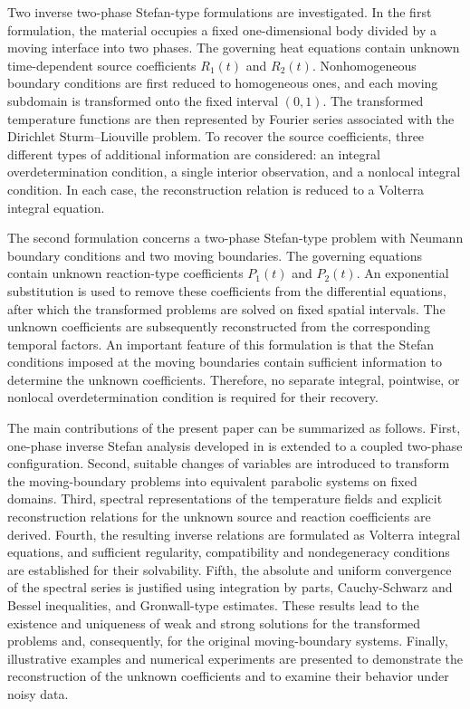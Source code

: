 \documentclass[preprint,12pt,authoryear]{elsarticle}
\begin{document}
Two inverse two-phase Stefan-type formulations are investigated. In the first
formulation, the material occupies a fixed one-dimensional body divided by a moving interface into two phases. The governing heat equations contain unknown time-dependent source coefficients \(R_1(t)\) and \(R_2(t)\). Nonhomogeneous boundary conditions are first reduced to homogeneous ones, and each moving subdomain is transformed onto the fixed interval \((0,1)\). The transformed temperature functions are then represented by Fourier series associated with the Dirichlet Sturm--Liouville problem. To recover the source coefficients, three different types of additional information are considered: an integral overdetermination condition, a single interior observation, and a nonlocal integral condition. In each case, the reconstruction relation is reduced to a Volterra integral equation.

The second formulation concerns a two-phase Stefan-type problem with Neumann boundary conditions and two moving boundaries. The governing equations contain unknown reaction-type coefficients \(P_1(t)\) and \(P_2(t)\). An exponential substitution is used to remove these coefficients from the differential equations, after which the transformed problems are solved on fixed spatial intervals. The unknown coefficients are subsequently reconstructed from the corresponding temporal factors. An important feature of this formulation is that the Stefan conditions imposed at the moving
boundaries contain sufficient information to determine the unknown coefficients. Therefore, no separate integral, pointwise, or nonlocal overdetermination condition is required for their recovery.

The main contributions of the present paper can be summarized as follows. First, one-phase inverse Stefan analysis developed in \cite{20} is extended to a coupled two-phase configuration. Second, suitable changes of variables are introduced to transform the moving-boundary problems into equivalent parabolic systems on fixed domains. Third, spectral representations of the temperature fields and explicit reconstruction relations for the unknown source and reaction coefficients are derived. Fourth, the resulting inverse relations are formulated as Volterra integral equations, and sufficient regularity, compatibility and nondegeneracy conditions are established for their solvability. Fifth, the absolute and uniform convergence of the spectral series is justified using integration by parts, Cauchy-Schwarz and Bessel inequalities, and Gronwall-type estimates. These results lead to the existence and uniqueness of weak and strong solutions for the transformed problems and, consequently, for the original moving-boundary systems. Finally, illustrative examples and numerical experiments are presented to demonstrate the reconstruction of the unknown coefficients and to examine their behavior under noisy data.
\end{document}

